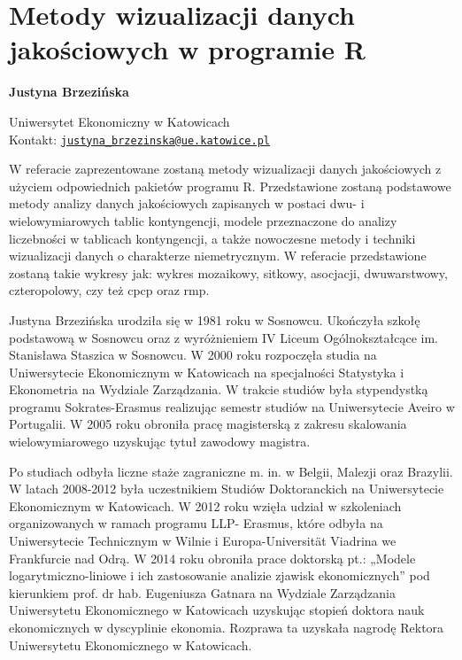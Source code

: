 \documentclass[\main/boa.tex]{subfiles}
\begin{document}
\section{Metody wizualizacji danych jakościowych w programie R}


\begin{minipage}{0.915\textwidth}
	\centering
  {\bf \huge {} Justyna Brzezińska}
\end{minipage}


\vskip 0.3cm

\begin{affiliations}
\begin{minipage}{0.915\textwidth}
\centering
\large Uniwersytet Ekonomiczny w Katowicach   \\[5pt]
Kontakt: \href{mailto:justyna_brzezinska@ue.katowice.pl}{\nolinkurl{justyna_brzezinska@ue.katowice.pl}}\\
\end{minipage}
\end{affiliations}

\vskip 0.8cm

W referacie zaprezentowane zostaną metody wizualizacji danych jakościowych z użyciem odpowiednich pakietów programu R. Przedstawione zostaną podstawowe metody analizy danych jakościowych zapisanych w postaci dwu- i wielowymiarowych tablic kontyngencji, modele przeznaczone do analizy liczebności w tablicach kontyngencji, a także nowoczesne metody i techniki wizualizacji danych o charakterze niemetrycznym. W referacie przedstawione zostaną takie wykresy jak: wykres mozaikowy, sitkowy, asocjacji, dwuwarstwowy, czteropolowy, czy też cpcp oraz rmp. 

\bio
Justyna Brzezińska urodziła się w 1981 roku w Sosnowcu. Ukończyła szkołę podstawową w Sosnowcu oraz z wyróżnieniem IV Liceum Ogólnokształcące im. Stanisława Staszica w Sosnowcu. W 2000 roku rozpoczęła studia na Uniwersytecie Ekonomicznym w Katowicach na specjalności Statystyka i Ekonometria na Wydziale Zarządzania. W trakcie studiów była stypendystką programu Sokrates-Erasmus realizując semestr studiów na Uniwersytecie Aveiro w Portugalii. W 2005 roku obroniła pracę magisterską z zakresu skalowania wielowymiarowego uzyskując tytuł zawodowy magistra.

Po studiach odbyła liczne staże zagraniczne m. in. w Belgii, Malezji oraz Brazylii. W latach 2008-2012 była uczestnikiem Studiów Doktoranckich na Uniwersytecie Ekonomicznym w Katowicach. W 2012 roku wzięła udział w szkoleniach organizowanych w ramach programu LLP- Erasmus, które odbyła na Uniwersytecie Technicznym w Wilnie i Europa-Universität Viadrina we Frankfurcie nad Odrą. W 2014 roku obroniła prace doktorską pt.: „Modele logarytmiczno-liniowe i ich zastosowanie analizie zjawisk ekonomicznych” pod kierunkiem prof. dr hab. Eugeniusza Gatnara na Wydziale Zarządzania Uniwersytetu Ekonomicznego w Katowicach uzyskując stopień doktora nauk ekonomicznych w dyscyplinie ekonomia. Rozprawa ta uzyskała nagrodę Rektora Uniwersytetu Ekonomicznego w Katowicach.
\end{document}
